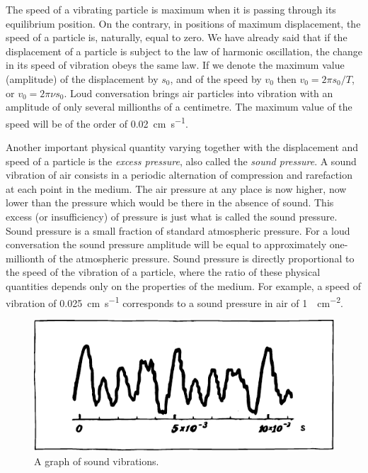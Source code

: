 The speed of a vibrating particle is maximum when it is passing through its equilibrium position. On the con­trary, in positions of maximum displacement, the speed of a particle is, naturally, equal to zero. We have already said that if the displacement of a particle is subject to the law of harmonic oscillation, the change in its speed of vibration obeys the same law. If we denote the maximum value (amplitude) of the displacement by $s_{0}$, and of the speed by $v_{0}$ then $v_{0}= 2 \pi s_{0}/T$, or $v_{0}= 2 \pi \nu s_{0}$. Loud con­versation brings air particles into vibration with an amplitude of only several millionths of a centimetre. The maximum value of the speed will be of the order of \SI{0.02}{\centi\meter\per\second}.

Another important physical quantity varying together with the displacement and speed of a particle is the \emph{excess pressure}, also called the \emph{sound pressure}. A sound vibration of air consists in a periodic alternation of compression and rarefaction at each point in the medium. The air pressure at any place is now higher, now lower than the pressure which would be there in the absence of sound. This excess (or insufficiency) of pressure is just what is called the sound pressure. Sound pressure is a small fraction of standard atmospheric pressure. For a loud conversation the sound pressure amplitude will be equal to approxi­mately one-millionth of the atmospheric pressure. Sound pressure is directly proportional to the speed of the vibra­tion of a particle, where the ratio of these physical quantities depends only on the properties of the medium. For example, a speed of vibration of \SI{0.025}{\centi\meter\per\second} corresponds to a sound pressure in air of \SI{1}{\dyne\per\centi\meter\squared}.

\begin{figure}[!ht]
\centering
\includegraphics[width=\textwidth]{figures/fig-06-09.pdf}
\caption{A graph of sound vibrations.}
\label{fig-6.9}
\end{figure}

